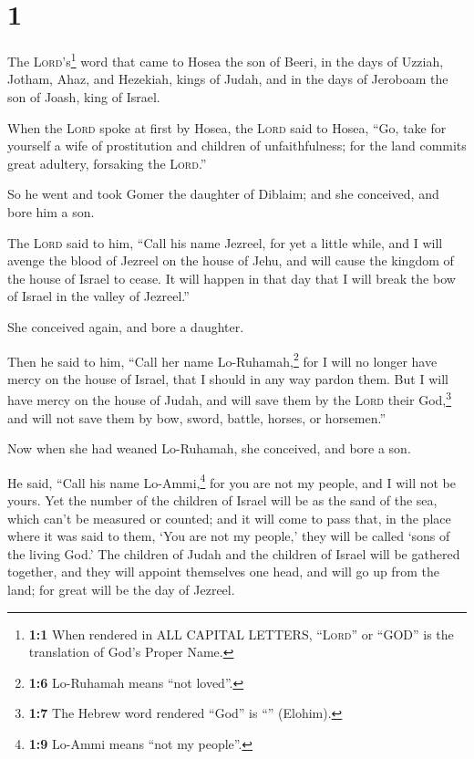 \hypertarget{section}{%
\section{1}\label{section}}

 The \textsc{Lord}'s\footnote{\textbf{1:1} When rendered
  in ALL CAPITAL LETTERS, ``\textsc{Lord}'' or ``GOD'' is the
  translation of God's Proper Name.} word that came to Hosea the son of
Beeri, in the days of Uzziah, Jotham, Ahaz, and Hezekiah, kings of
Judah, and in the days of Jeroboam the son of Joash, king of Israel.

 When the \textsc{Lord} spoke at first by Hosea, the
\textsc{Lord} said to Hosea, ``Go, take for yourself a wife of
prostitution and children of unfaithfulness; for the land commits great
adultery, forsaking the \textsc{Lord}.''

 So he went and took Gomer the daughter of Diblaim; and
she conceived, and bore him a son.

 The \textsc{Lord} said to him, ``Call his name Jezreel,
for yet a little while, and I will avenge the blood of Jezreel on the
house of Jehu, and will cause the kingdom of the house of Israel to
cease.  It will happen in that day that I will break the
bow of Israel in the valley of Jezreel.''

 She conceived again, and bore a daughter.

Then he said to him, ``Call her name Lo-Ruhamah,\footnote{\textbf{1:6}
  Lo-Ruhamah means ``not loved''.} for I will no longer have mercy on
the house of Israel, that I should in any way pardon them.
 But I will have mercy on the house of Judah, and will
save them by the \textsc{Lord} their God,\footnote{\textbf{1:7} The
  Hebrew word rendered ``God'' is ``'' (Elohim).} and will
not save them by bow, sword, battle, horses, or horsemen.''

 Now when she had weaned Lo-Ruhamah, she conceived, and
bore a son.

 He said, ``Call his name Lo-Ammi,\footnote{\textbf{1:9}
  Lo-Ammi means ``not my people''.} for you are not my people, and I
will not be yours.  Yet the number of the children of
Israel will be as the sand of the sea, which can't be measured or
counted; and it will come to pass that, in the place where it was said
to them, `You are not my people,' they will be called `sons of the
living God.'  The children of Judah and the children of
Israel will be gathered together, and they will appoint themselves one
head, and will go up from the land; for great will be the day of
Jezreel.

